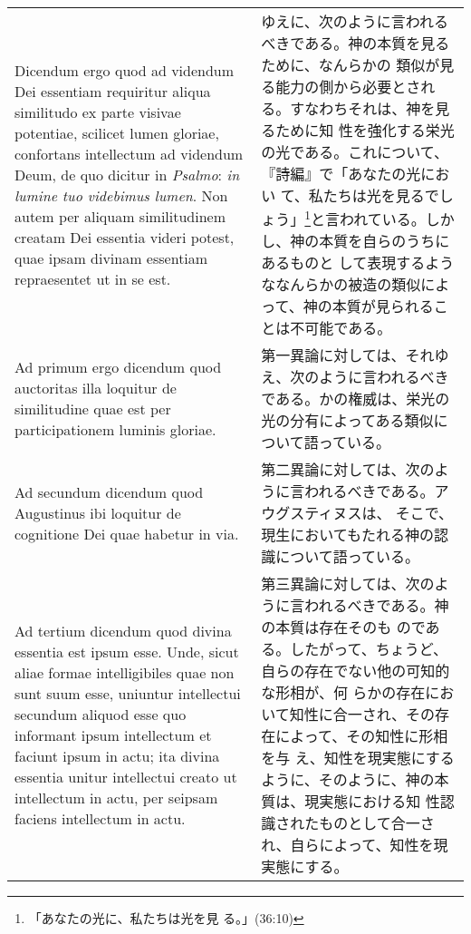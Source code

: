 \documentclass[10pt]{jsarticle} %
\begin{document}
\begin{longtable}{p{21em}p{21em}}
\\


Dicendum ergo quod ad videndum Dei essentiam requiritur aliqua
similitudo ex parte visivae potentiae, scilicet lumen gloriae,
confortans intellectum ad videndum Deum, de quo dicitur in {\itshape
Psalmo}: {\it in lumine tuo videbimus lumen}. Non autem per aliquam
similitudinem creatam Dei essentia videri potest, quae ipsam divinam
essentiam repraesentet ut in se est.

&

ゆえに、次のように言われるべきである。神の本質を見るために、なんらかの
類似が見る能力の側から必要とされる。すなわちそれは、神を見るために知
性を強化する栄光の光である。これについて、『詩編』で「あなたの光におい
て、私たちは光を見るでしょう」\footnote{「あなたの光に、私たちは光を見
る。」(36:10)}と言われている。しかし、神の本質を自らのうちにあるものと
して表現するようななんらかの被造の類似によって、神の本質が見られるこ
とは不可能である。

\\


{\sc  Ad primum ergo dicendum} quod auctoritas illa loquitur de
similitudine quae est per participationem luminis gloriae.  

&

第一異論に対しては、それゆえ、次のように言われるべきである。かの権威は、栄光の
光の分有によってある類似について語っている。


\\

{\sc  Ad secundum dicendum} quod Augustinus ibi loquitur de
cognitione Dei quae habetur in via.

&

第二異論に対しては、次のように言われるべきである。アウグスティヌスは、
そこで、現生においてもたれる神の認識について語っている。

\\

{\sc Ad tertium dicendum} quod divina essentia est ipsum esse. Unde,
sicut aliae formae intelligibiles quae non sunt suum esse, uniuntur
intellectui secundum aliquod esse quo informant ipsum intellectum et
faciunt ipsum in actu; ita divina essentia unitur intellectui creato
ut intellectum in actu, per seipsam faciens intellectum in actu.

&

第三異論に対しては、次のように言われるべきである。神の本質は存在そのも
のである。したがって、ちょうど、自らの存在でない他の可知的な形相が、何
らかの存在において知性に合一され、その存在によって、その知性に形相を与
え、知性を現実態にするように、そのように、神の本質は、現実態における知
性認識されたものとして合一され、自らによって、知性を現実態にする。

\end{longtable}
\newpage
\end{document}
